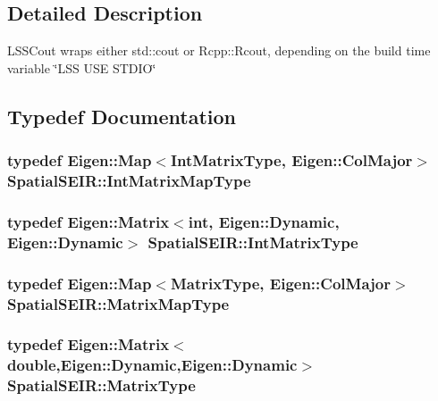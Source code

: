 \subsection{Detailed Description}
L\-S\-S\-Cout wraps either std\-::cout or Rcpp\-::\-Rcout, depending on the build time variable \char`\"{}\-L\-S\-S U\-S\-E S\-T\-D\-I\-O\char`\"{} 

\subsection{Typedef Documentation}
\hypertarget{namespaceSpatialSEIR_aef5eeacdd778eee57264f9ca171dd505}{
\subsubsection[{Int\-Matrix\-Map\-Type}]{\setlength{\rightskip}{0pt plus 5cm}typedef Eigen\-::\-Map$<${\bf Int\-Matrix\-Type}, Eigen\-::\-Col\-Major$>$ {\bf Spatial\-S\-E\-I\-R\-::\-Int\-Matrix\-Map\-Type}}}\label{namespaceSpatialSEIR_aef5eeacdd778eee57264f9ca171dd505}
\hypertarget{namespaceSpatialSEIR_a61e75b01f74b5a08c1528ac3bce40efd}{
\subsubsection[{Int\-Matrix\-Type}]{\setlength{\rightskip}{0pt plus 5cm}typedef Eigen\-::\-Matrix$<$int, Eigen\-::\-Dynamic, Eigen\-::\-Dynamic$>$ {\bf Spatial\-S\-E\-I\-R\-::\-Int\-Matrix\-Type}}}\label{namespaceSpatialSEIR_a61e75b01f74b5a08c1528ac3bce40efd}
\hypertarget{namespaceSpatialSEIR_a56ce20bdcae25d006d2ddc637596dbd3}{
\subsubsection[{Matrix\-Map\-Type}]{\setlength{\rightskip}{0pt plus 5cm}typedef Eigen\-::\-Map$<${\bf Matrix\-Type}, Eigen\-::\-Col\-Major$>$ {\bf Spatial\-S\-E\-I\-R\-::\-Matrix\-Map\-Type}}}\label{namespaceSpatialSEIR_a56ce20bdcae25d006d2ddc637596dbd3}
\hypertarget{namespaceSpatialSEIR_a998a0502213346d0f88197c232de3331}{
\subsubsection[{Matrix\-Type}]{\setlength{\rightskip}{0pt plus 5cm}typedef Eigen\-::\-Matrix$<$double,Eigen\-::\-Dynamic,Eigen\-::\-Dynamic$>$ {\bf Spatial\-S\-E\-I\-R\-::\-Matrix\-Type}}}\label{namespaceSpatialSEIR_a998a0502213346d0f88197c232de3331}


